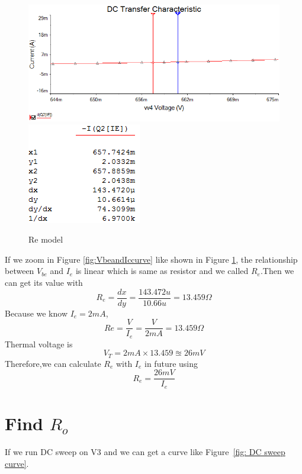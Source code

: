 \begin{figure}[htbp]
	\centering
	\includegraphics[scale=0.6]{"../Photo/Chap1/Re model"}\\[0.5cm]
	\includegraphics[scale=0.8]{"../Photo/Chap1/Re model data"}
	\caption{Re model}
	\label{fig:Re model}
\end{figure}

If we zoom in Figure \ref{fig:VbeandIccurve} like shown in Figure \ref{fig:Re model}, the relationship between $ V_{be} $ and $ I_e $ is linear which is same as resistor and we called $ R_e $.Then we can get its value with
\[ R_e = \frac{dx}{dy} = \frac{143.472u}{10.66u} = 13.459 \Omega\]
Because we know $ I_e = 2mA $, 
\[ Re = \frac{V}{I_e} = \frac{V}{2mA}=13.459\Omega\]
Thermal voltage is
\[ V_T = 2mA \times 13.459 \approxeq 26mV \] 
Therefore,we can calculate $ R_{e} $ with $ I_e $ in future using
\begin{equation}
	R_{e} = \frac{26 mV}{I_{e}}
\end{equation}

\section{Find $R_o$} %
\label{sec:find_Ro}


If we run DC sweep on V3 and we can get a curve like Figure~\ref{fig: DC sweep curve}.

